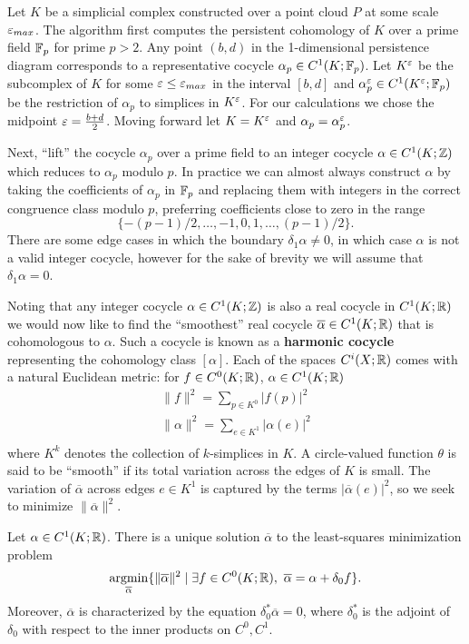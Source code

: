 Let $K$ be a simplicial complex constructed over a point cloud $P$ at some scale $\varepsilon_{max}$.
The algorithm first computes the persistent cohomology of $K$ over a prime field $\mathbb{F}_p$ for prime $p > 2$.
Any point $(b, d)$ in the 1-dimensional persistence diagram corresponds to a representative cocycle $\alpha_p\in C^1(K;\mathbb{F}_p)$.
Let $K^\varepsilon$ be the subcomplex of $K$ for some $\varepsilon\leq \varepsilon_{max}$ in the interval $[b, d]$ and $\alpha^\varepsilon_p\in C^1(K^\varepsilon;\mathbb{F}_p)$ be the restriction of $\alpha_p$ to simplices in $K^\varepsilon$.
For our calculations we chose the midpoint $\varepsilon = \frac{b+d}{2}$.
Moving forward let $K = K^\varepsilon$ and $\alpha_p = \alpha^\varepsilon_p$.

Next, ``lift'' the cocycle $\alpha_p$ over a prime field to an integer cocycle $\alpha\in C^1(K;\mathbb{Z})$ which reduces to $\alpha_p$ modulo $p$.
In practice we can almost always construct $\alpha$ by taking the coefficients of $\alpha_p$ in $\mathbb{F}_p$ and replacing them with integers in the correct congruence class modulo $p$, preferring coefficients close to zero in the range
\[ \{-(p-1)/2,\ldots,-1,0,1,\ldots,(p-1)/2\}. \]
There are some edge cases in which the boundary $\delta_1\alpha\neq 0$, in which case $\alpha$ is not a valid integer cocycle, however for the sake of brevity we will assume that $\delta_1\alpha = 0$.

Noting that any integer cocycle $\alpha\in C^1(K;\mathbb{Z})$ is also a real cocycle in $C^1(K;\mathbb{R})$ we would now like to find the ``smoothest'' real cocycle $\overline{\alpha}\in C^1(K;\mathbb{R})$ that is cohomologous to $\alpha$.
Such a cocycle is known as a \textbf{harmonic cocycle} representing the cohomology class $[\alpha]$.
Each of the spaces $C^i(X;\mathbb{R})$ comes with a natural Euclidean metric: for $f\in C^0(K;\mathbb{R})$, $\alpha\in C^1(K;\mathbb{R})$ %
\begin{align}
    \|f\|^2 = \sum_{p\in K^0} |f(p)|^2\\
    \|\alpha\|^2 = \sum_{e\in K^1} |\alpha(e)|^2\\
\end{align}
where $K^k$ denotes the collection of $k$-simplices in $K$.
A circle-valued function $\theta$ is said to be ``smooth'' if its total variation across the edges of $K$ is small.
The variation of $\overline{\alpha}$ across edges $e\in K^1$ is captured by the terms $|\overline{\alpha}(e)|^2$, so we seek to minimize $\|\overline{\alpha}\|^2$.

\begin{proposition}
    Let $\alpha\in C^1(K; \mathbb{R})$.
    There is a unique solution $\overline{\alpha}$ to the least-squares minimization problem
    \[ \operatorname*{argmin}_{\overline{\alpha}} \{\|\overline{\alpha}\|^2\mid \exists f\in C^0(K;\mathbb{R}),\ \overline{\alpha} = \alpha + \delta_0 f\}.\]
    Moreover, $\overline{\alpha}$ is characterized by the equation $\delta_0^*\overline{\alpha} = 0$, where $\delta_0^*$ is the adjoint of $\delta_0$ with respect to the inner products on $C^0, C^1$.
\end{proposition}

